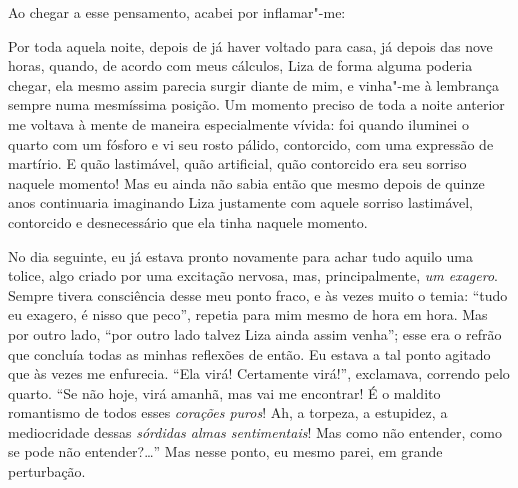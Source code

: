 Ao chegar a esse pensamento, acabei por inflamar"-me:



Por toda aquela noite, depois de já haver voltado para casa, já depois
das nove horas, quando, de acordo com meus cálculos, Liza de forma
alguma poderia chegar, ela mesmo assim parecia surgir diante de mim, e
vinha"-me à lembrança sempre numa mesmíssima posição. Um momento preciso
de toda a noite anterior me voltava à mente de maneira especialmente
vívida: foi quando iluminei o quarto com um fósforo e vi seu rosto
pálido, contorcido, com uma expressão de martírio. E quão lastimável,
quão artificial, quão contorcido era seu sorriso naquele momento! Mas
eu ainda não sabia então que mesmo depois de quinze anos continuaria
imaginando Liza justamente com aquele sorriso lastimável, contorcido e
desnecessário que ela tinha naquele momento.

No dia seguinte, eu já estava pronto novamente para achar tudo aquilo
uma tolice, algo criado por uma excitação nervosa, mas, principalmente,
\textit{um exagero}. Sempre tivera consciência desse
meu ponto fraco, e às vezes muito o temia: ``tudo eu exagero, é nisso
que peco'', repetia para mim mesmo de hora em hora. Mas por outro lado,
``por outro lado talvez Liza ainda assim venha''; esse era o refrão que
concluía todas as minhas reflexões de então. Eu estava a tal ponto
agitado que às vezes me enfurecia. ``Ela virá! Certamente virá!'',
exclamava, correndo pelo quarto. ``Se não hoje, virá amanhã, mas vai me
encontrar! É o maldito romantismo de todos esses
\textit{corações puros}! Ah, a torpeza, a estupidez,
a mediocridade dessas \textit{sórdidas almas sentimentais}! Mas como não
entender, como se pode não entender?\ldots{}'' Mas nesse ponto, eu mesmo
parei, em grande perturbação.


